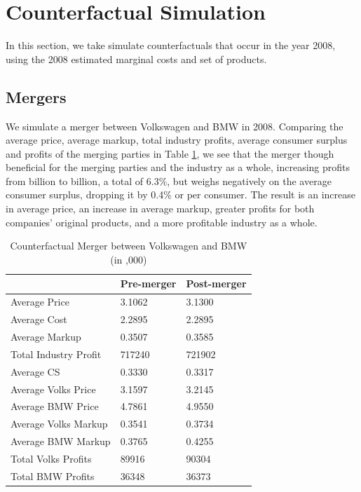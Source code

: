 \documentclass[a4paper,12pt]{article}
\begin{document}
\newpage    
\section{Counterfactual Simulation}

In this section, we take simulate counterfactuals that occur in the year 2008, using the 2008 estimated marginal costs and set of products.

\subsection{Mergers}

We simulate a merger between Volkswagen and BMW in 2008. Comparing the average price, average markup, total industry profits, average consumer surplus and profits of the merging parties in Table \ref{m2}, we see that the merger though beneficial for the merging parties and the industry as a whole, increasing profits from  billion to  billion, a total of 6.3\%, but weighs negatively on the average consumer surplus, dropping it by 0.4\% or  per consumer. The result is an increase in average price, an increase in average markup, greater profits for both companies' original products, and a more profitable industry as a whole.

\begin{table}[h!]
    \centering
    \caption{Counterfactual Merger between Volkswagen and BMW (in ,000)}
    \begin{tabular}{lll} 
    \hline\hline
                          & Pre-merger & Post-merger  \\ 
    \hline
    Average Price         & 3.1062     & 3.1300       \\
    Average Cost          & 2.2895     & 2.2895       \\
    Average Markup        & 0.3507     & 0.3585       \\
    Total Industry Profit & 717240     & 721902       \\
    Average CS            & 0.3330     & 0.3317       \\
    Average Volks Price   & 3.1597     & 3.2145       \\
    Average BMW Price     & 4.7861     & 4.9550       \\
    Average Volks Markup  & 0.3541     & 0.3734       \\
    Average BMW Markup    & 0.3765     & 0.4255       \\
    Total Volks Profits   & 89916      & 90304        \\
    Total BMW Profits     & 36348      & 36373        \\
    \hline\hline
    \end{tabular}
    \label{m2} 
 \end{table}
\end{document}
